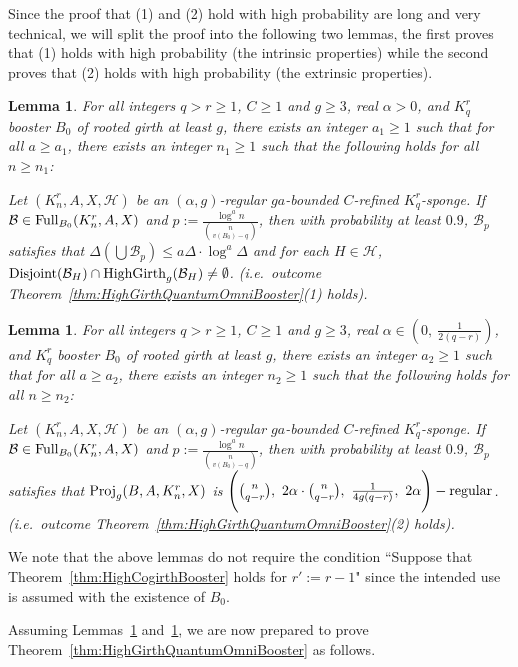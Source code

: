 \documentclass[11pt]{article}
\newcommand{\mc}[1]{\mathcal{#1}}
\newcounter{i}
\theoremstyle{plain}
\newtheorem{lem}[thm]{Lemma}
\theoremstyle{plain} %
\theoremstyle{definition}
\begin{document}
Since the proof that (1) and (2) hold with high probability are long and very technical, we will split the proof into the following two lemmas, the first proves that (1) holds with high probability (the intrinsic properties) while the second proves that (2) holds with high probability (the extrinsic properties).

\begin{lem}\label{lem:RandomQuantumIntrinsic}
For all integers $q>r\ge 1$, $C\ge 1$ and $g\ge 3$, real $\alpha > 0$, and $K_q^r$ booster $B_0$ of rooted girth at least $g$, there exists an integer $a_1\ge 1$ such that for all $a\ge a_1$, there exists an integer $n_1\ge 1$ such that the following holds for all $n\ge n_1$: 

Let $(K_n^r, A, X,\mc{H})$ be an $(\alpha,g)$-regular $ga$-bounded $C$-refined $K_q^r$-sponge. If $\mc{B}\in {\rm Full}_{B_0}(K_n^r,A,X)$ and $p :=\frac{\log^{a} n}{\binom{n}{v(B_0)-q}}$, then with probability at least $0.9$, $\mc{B}_p$ satisfies that $\Delta(\bigcup \mc{B}_p)\le a\Delta\cdot \log^{a} \Delta$ and for each $H\in \mathcal{H}$, ${\rm Disjoint}(\mc{B}_H) \cap {\rm HighGirth}_g(\mc{B}_H) \ne \emptyset$. (i.e.~outcome Theorem~\ref{thm:HighGirthQuantumOmniBooster}(1) holds).
\end{lem}

\begin{lem}\label{lem:RandomQuantumExtrinsic}
For all integers $q>r\ge 1$, $C\ge 1$ and $g\ge 3$, real $\alpha \in \left(0,~\frac{1}{2(q-r)}\right)$, and $K_q^r$ booster $B_0$ of rooted girth at least $g$, there exists an integer $a_2\ge 1$ such that for all $a\ge a_2$, there exists an integer $n_2\ge 1$ such that the following holds for all $n\ge n_2$: 

Let $(K_n^r, A, X,\mc{H})$ be an $(\alpha,g)$-regular $ga$-bounded $C$-refined $K_q^r$-sponge. If $\mc{B}\in {\rm Full}_{B_0}(K_n^r,A,X)$ and $p :=\frac{\log^{a} n}{\binom{n}{v(B_0)-q}}$, then with probability at least $0.9$, $\mc{B}_p$ satisfies that ${\rm Proj}_g(B,A,K_n^r,X)$ is $\Bigg(\binom{n}{q-r},~2\alpha \cdot \binom{n}{q-r},~\frac{1}{4g(q-r)},~2\alpha\Bigg)-{\rm regular}$. (i.e.~outcome Theorem~\ref{thm:HighGirthQuantumOmniBooster}(2) holds).
\end{lem}

We note that the above lemmas do not require the condition ``Suppose that Theorem~\ref{thm:HighCogirthBooster} holds for $r':=r-1$" since the intended use is assumed with the existence of $B_0$. 

Assuming Lemmas~\ref{lem:RandomQuantumIntrinsic} and~\ref{lem:RandomQuantumExtrinsic}, we are now prepared to prove Theorem~\ref{thm:HighGirthQuantumOmniBooster} as follows.
\end{document}

